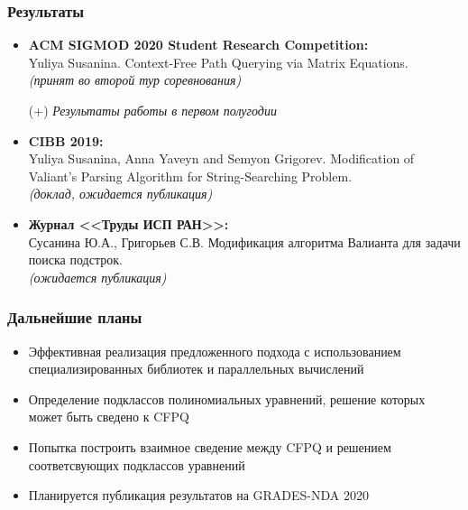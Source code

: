 \documentclass[xcolor=table]{beamer}
\begin{document}
\begin{frame}[fragile]
  \transwipe[direction=90]
  \frametitle{Результаты}
  
\begin{itemize}

  \item \textbf{ACM SIGMOD 2020 Student Research Competition:} \\ 
  Yuliya Susanina. Context-Free Path Querying via Matrix Equations.\\
  \textit{(принят во второй тур соревнования)}
  
\vspace{10pt}\hspace{-30pt} (+) \textit{Результаты работы в первом полугодии}
  
  \item \textbf{CIBB 2019:} \\
  Yuliya Susanina, Anna Yaveyn and Semyon Grigorev. Modification of Valiant’s Parsing Algorithm for String-Searching Problem. \\
  \textit{(доклад, ожидается публикация)}
  \item \textbf{Журнал <<Труды ИСП РАН>>:} \\
  Сусанина Ю.А., Григорьев С.В. Модификация алгоритма Валианта для задачи поиска подстрок. \\
  \textit{(ожидается публикация)}
  
\end{itemize}

\end{frame}




\begin{frame}[fragile]
  \transwipe[direction=90]
  \frametitle{Дальнейшие планы}

\begin{itemize}
    \item Эффективная реализация предложенного подхода с использованием специализированных библиотек и параллельных вычислений
    \item Определение подклассов полиномиальных уравнений, решение которых может быть сведено к CFPQ
    \item Попытка построить взаимное сведение между CFPQ и решением соответсвующих подклассов уравнений
    \item Планируется публикация результатов на GRADES-NDA 2020
\end{itemize}

\end{frame}
\end{document}
